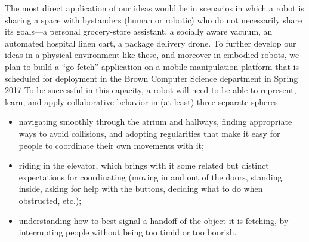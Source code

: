The most direct application of our ideas would be in scenarios in
which a robot is sharing a space with bystanders (human or robotic)
who do not necessarily share its goals---a personal grocery-store
assistant, a socially aware vacuum, an automated hospital linen cart,
a package delivery drone.  To further develop our ideas in a physical
environment like these, and moreover in embodied robots,
we plan to build a ``go fetch'' application on a mobile-manipulation
platform that is scheduled for deployment in the Brown Computer Science department in Spring 2017
To be successful in this capacity, a robot will need to be able to
represent, learn, and apply collaborative behavior in (at least) three
separate spheres:

\begin{itemize}
\item navigating smoothly through the atrium and hallways, finding
  appropriate ways to avoid collisions, and adopting regularities that
  make it easy for people to coordinate their own movements with it;

\item riding in the elevator, which brings with it some related but
  distinct expectations for coordinating (moving in and out of the
  doors, standing inside, asking for help with the buttons, deciding
  what to do when obstructed, etc.);

\item understanding how to best signal a handoff of the object it is
  fetching, by interrupting people without being too timid or too
  boorish.
\end{itemize}


